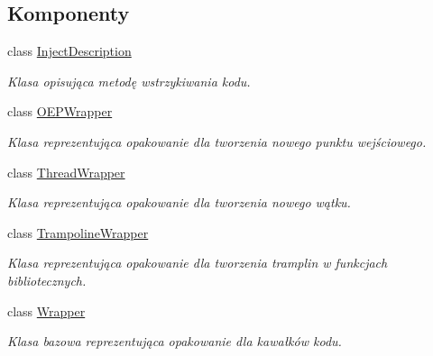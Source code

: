 \subsection*{Komponenty}
\begin{DoxyCompactItemize}
\item 
class \hyperlink{class_d_adding_methods_1_1_inject_description}{Inject\-Description}
\begin{DoxyCompactList}\small\item\em Klasa opisująca metodę wstrzykiwania kodu. \end{DoxyCompactList}\item 
class \hyperlink{class_d_adding_methods_1_1_o_e_p_wrapper}{O\-E\-P\-Wrapper}
\begin{DoxyCompactList}\small\item\em Klasa reprezentująca opakowanie dla tworzenia nowego punktu wejściowego. \end{DoxyCompactList}\item 
class \hyperlink{class_d_adding_methods_1_1_thread_wrapper}{Thread\-Wrapper}
\begin{DoxyCompactList}\small\item\em Klasa reprezentująca opakowanie dla tworzenia nowego wątku. \end{DoxyCompactList}\item 
class \hyperlink{class_d_adding_methods_1_1_trampoline_wrapper}{Trampoline\-Wrapper}
\begin{DoxyCompactList}\small\item\em Klasa reprezentująca opakowanie dla tworzenia tramplin w funkcjach bibliotecznych. \end{DoxyCompactList}\item 
class \hyperlink{class_d_adding_methods_1_1_wrapper}{Wrapper}
\begin{DoxyCompactList}\small\item\em Klasa bazowa reprezentująca opakowanie dla kawałków kodu. \end{DoxyCompactList}\end{DoxyCompactItemize}
